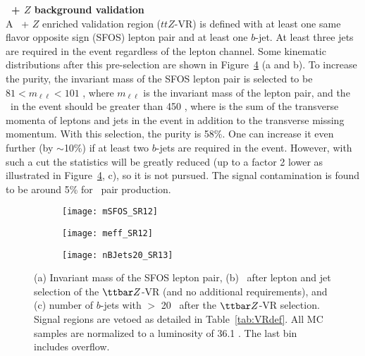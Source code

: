 \par{\bf \ttbar\ + $Z$ background validation\\}
A \ttbar\ + $Z$ enriched validation region ($ttZ$-VR) is defined with at least one same flavor opposite sign (SFOS) lepton pair and at least one $b$-jet. At least three jets are required in the event regardless of the lepton channel. Some kinematic distributions after this pre-selection are shown in Figure~\ref{fig:ttZ_VR_afterLepJetSel} (a and b). To increase the purity, the invariant mass of the SFOS lepton pair is selected to be $81 < m_{\ell\ell} < 101$ \GeV, where 
$m_{\ell\ell}$ is the invariant mass of the lepton pair,
and the \meff\ in the event should be greater than 450 \GeV,
where \meff is the sum of the transverse momenta of leptons and jets in the 
event in addition to the transverse missing momentum. 
With this selection, the purity is 58\%. One can increase it even further (by $\sim$10\%) if at least two $b$-jets are required in the event. However, with such a cut the statistics will be greatly reduced (up to a factor 2 lower as illustrated in Figure~\ref{fig:ttZ_VR_afterLepJetSel}, c), so it is not pursued. The signal contamination is found to be around 5\% for \sbsb\ pair production.

\begin{figure}[htb!]
\centering
\begin{subfigure}[t]{0.49\textwidth}
\texttt{[image: mSFOS\_SR12]}
\subcaption{}\label{fig:ttza}\end{subfigure}
\begin{subfigure}[t]{0.49\textwidth}
\texttt{[image: meff\_SR12]}
\subcaption{}\label{fig:ttzb}\end{subfigure}
\begin{subfigure}[t]{0.49\textwidth}
\texttt{[image: nBJets20\_SR13]}
\subcaption{}\label{fig:ttzc}\end{subfigure}
\caption{(a) Invariant mass of the SFOS lepton pair, (b) \meff\ after lepton and jet selection of the $\ttbar Z$-VR (and no additional requirements), and (c) number of $b$-jets with \pt $>$ 20 \GeV~after the $\ttbar Z$-VR selection. Signal regions are vetoed as detailed in Table~\ref{tab:VRdef}. All MC samples are normalized to a luminosity of 36.1 \ifb. The last bin includes overflow.
}
\label{fig:ttZ_VR_afterLepJetSel}
\end{figure} 


